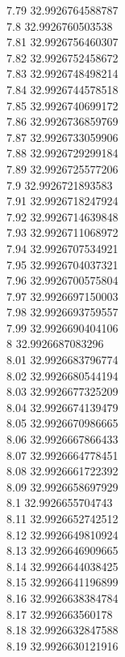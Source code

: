 {7.79	32.9926764588787\\
7.8	32.9926760503538\\
7.81	32.9926756460307\\
7.82	32.9926752458672\\
7.83	32.9926748498214\\
7.84	32.9926744578518\\
7.85	32.9926740699172\\
7.86	32.9926736859769\\
7.87	32.9926733059906\\
7.88	32.9926729299184\\
7.89	32.9926725577206\\
7.9	32.9926721893583\\
7.91	32.9926718247924\\
7.92	32.9926714639848\\
7.93	32.9926711068972\\
7.94	32.9926707534921\\
7.95	32.9926704037321\\
7.96	32.9926700575804\\
7.97	32.9926697150003\\
7.98	32.9926693759557\\
7.99	32.9926690404106\\
8	32.9926687083296\\
8.01	32.9926683796774\\
8.02	32.9926680544194\\
8.03	32.9926677325209\\
8.04	32.9926674139479\\
8.05	32.9926670986665\\
8.06	32.9926667866433\\
8.07	32.9926664778451\\
8.08	32.9926661722392\\
8.09	32.9926658697929\\
8.1	32.9926655704743\\
8.11	32.9926652742512\\
8.12	32.9926649810924\\
8.13	32.9926646909665\\
8.14	32.9926644038425\\
8.15	32.9926641196899\\
8.16	32.9926638384784\\
8.17	32.992663560178\\
8.18	32.9926632847588\\
8.19	32.9926630121916\\
}
